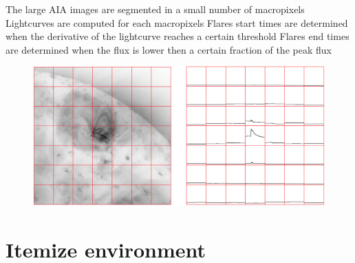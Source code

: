 The large AIA images are segmented in a small number of macropixels
Lightcurves are computed for each macropixels
Flares start times are determined when the derivative of the lightcurve reaches a certain threshold  
Flares end times are determined when the flux is lower then a certain fraction of the peak flux	

\begin{figure}%
\includegraphics[scale=.27]{images/flare_bin.png}
\end{figure}



\section{Itemize environment}







